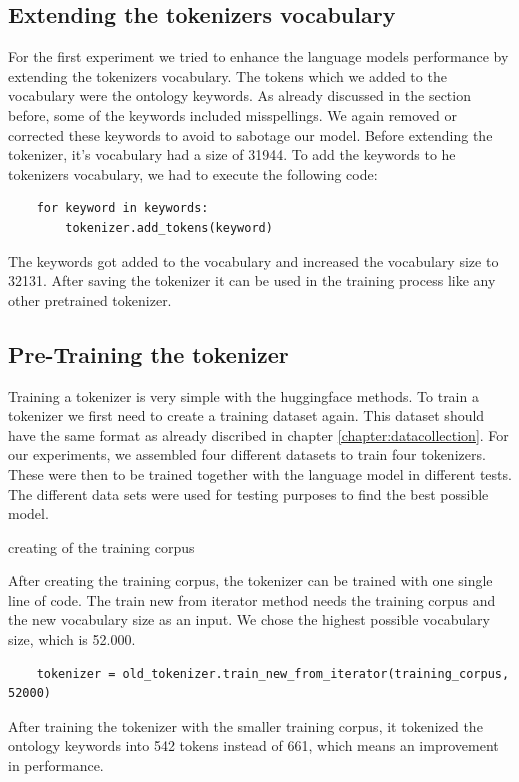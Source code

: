 \subsection{Extending the tokenizers vocabulary}
For the first experiment we tried to enhance the language models performance by extending the tokenizers vocabulary. The tokens which we added to the vocabulary were the ontology keywords. As already discussed in the \alert{section before}, some of the keywords included misspellings. We again removed or corrected these keywords to avoid to sabotage our model. \newline
Before extending the tokenizer, it's vocabulary had a size of 31944. To add the keywords to he tokenizers vocabulary, we had to execute the following code:

\begin{code}
	\label{code:extend_tokenizer}
\begin{verbatim}
	for keyword in keywords:
		tokenizer.add_tokens(keyword)
\end{verbatim}
\end{code}

The keywords got added to the vocabulary and increased the vocabulary size to 32131. After saving the tokenizer it can be used in the training process like any other pretrained tokenizer.

\subsection{Pre-Training the tokenizer}
Training a tokenizer is very simple with the\alert{ huggingface} methods. To train a tokenizer we first need to create a training dataset again. This dataset should have the same format as already discribed in chapter \ref{chapter:datacollection}. For our experiments, we assembled four different datasets to train four tokenizers. These were then to be trained together with the language model in different tests. The different data sets were used for testing purposes to find the best possible model.

\alert{creating of the training corpus}


After creating the training corpus, the tokenizer can be trained with one single line of code. The \alert{train new from iterator} method needs the training corpus and the new vocabulary size as an input. We chose the highest possible vocabulary size, which is 52.000.

\begin{code}
	\label{code:train_tokenizer}
\begin{verbatim}
	tokenizer = old_tokenizer.train_new_from_iterator(training_corpus, 52000)
\end{verbatim}
\end{code}
After training the tokenizer with the smaller training corpus, it tokenized the ontology keywords into 542 tokens instead of 661, which means an improvement in performance.

